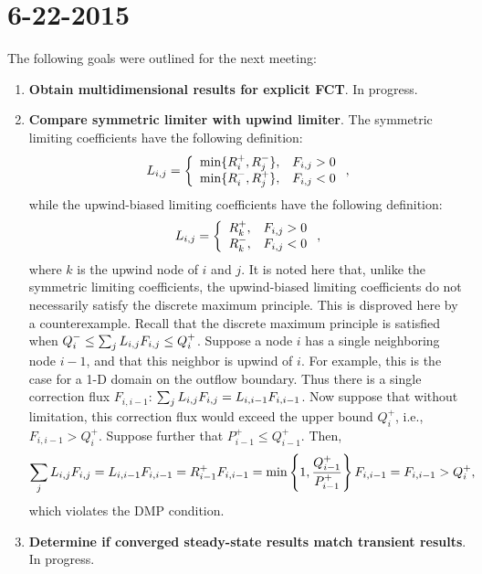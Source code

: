 \section*{6-22-2015}

The following goals were outlined for the next meeting:
\begin{enumerate}

\item \textbf{Obtain multidimensional results for explicit FCT}.
In progress.

\item \textbf{Compare symmetric limiter with upwind limiter}.
The symmetric limiting coefficients have the following definition:
\begin{equation}
  L_{i,j} = \left\{\begin{array}{l l}
    \min\{R_i^+,R_j^-\}, & F_{i,j} > 0 \\
    \min\{R_i^-,R_j^+\}, & F_{i,j} < 0
  \end{array}\right.,
\end{equation}
while the upwind-biased limiting coefficients have the following definition:
\begin{equation}
  L_{i,j} = \left\{\begin{array}{l l}
    R_k^+, & F_{i,j} > 0 \\
    R_k^-, & F_{i,j} < 0
  \end{array}\right.,
\end{equation}
where $k$ is the upwind node of $i$ and $j$. It is noted here that, unlike
the symmetric limiting coefficients, the upwind-biased limiting coefficients
do not necessarily satisfy the discrete maximum principle. This is disproved
here by a counterexample. Recall that the discrete maximum principle is satisfied when
$Q_i^-\le \sum_j L_{i,j} F_{i,j}\le Q_i^+$. Suppose a node $i$ has a single
neighboring node $i-1$, and that this neighbor is upwind of $i$. For example, this is
the case for a 1-D domain on the outflow boundary. Thus there is a single
correction flux $F_{i,i-1}$: $\sum_j L_{i,j} F_{i,j}=L_{i,i-1} F_{i,i-1}$. Now
suppose that without limitation, this correction flux would exceed the
upper bound $Q_i^+$, i.e., $F_{i,i-1}>Q_i^+$. Suppose further that
$P_{i-1}^+\leq Q_{i-1}^+$. Then,
\[
  \sum\limits_j L_{i,j} F_{i,j}=
  L_{i,i-1} F_{i,i-1}=
  R_{i-1}^+ F_{i,i-1}=
  \min\left\{1,\frac{Q_{i-1}^+}{P_{i-1}^+}\right\} F_{i,i-1}=
  F_{i,i-1}>
  Q_i^+,
\]
which violates the DMP condition.

\item \textbf{Determine if converged steady-state results match transient results}.
In progress.


\end{enumerate}
